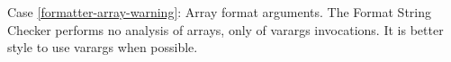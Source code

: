 Case \ref{formatter-array-warning}:
  Array format arguments.
  The Format String Checker performs no analysis of
  arrays, only of varargs invocations.  It is better style to use varargs
  when possible.


%
%
%
%
%
